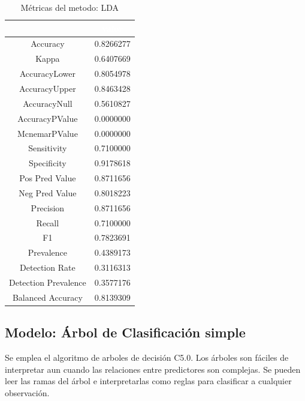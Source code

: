 \begin{table}[!h]
	
	\caption{\label{tab:metricas_LDA}Métricas del metodo: LDA }
	\centering
	\begin{tabular}[t]{cc}
		\toprule
		\rowcolor{black}  \multicolumn{1}{c}{\textcolor{white}{\textbf{metricas}}} & \multicolumn{1}{c}{\textcolor{white}{\textbf{valor}}}\\
		\midrule
		\rowcolor{gray!6}  Accuracy & 0.8266277\\
		Kappa & 0.6407669\\
		\rowcolor{gray!6}  AccuracyLower & 0.8054978\\
		AccuracyUpper & 0.8463428\\
		\rowcolor{gray!6}  AccuracyNull & 0.5610827\\
		\addlinespace
		AccuracyPValue & 0.0000000\\
		\rowcolor{gray!6}  McnemarPValue & 0.0000000\\
		Sensitivity & 0.7100000\\
		\rowcolor{gray!6}  Specificity & 0.9178618\\
		Pos Pred Value & 0.8711656\\
		\addlinespace
		\rowcolor{gray!6}  Neg Pred Value & 0.8018223\\
		Precision & 0.8711656\\
		\rowcolor{gray!6}  Recall & 0.7100000\\
		F1 & 0.7823691\\
		\rowcolor{gray!6}  Prevalence & 0.4389173\\
		\addlinespace
		Detection Rate & 0.3116313\\
		\rowcolor{gray!6}  Detection Prevalence & 0.3577176\\
		Balanced Accuracy & 0.8139309\\
		\bottomrule
	\end{tabular}
\end{table}



\subsection{Modelo: Árbol de Clasificación simple}

Se emplea el algoritmo de arboles de decisión C5.0. Los árboles son
fáciles de interpretar aun cuando las relaciones entre predictores son
complejas. Se pueden leer las ramas del árbol e interpretarlas como reglas para clasificar a cualquier observación.

